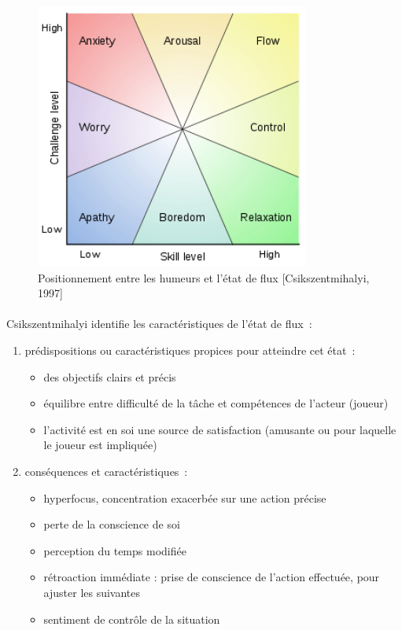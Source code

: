 \begin{figure}[h!]
	\centering
	\includegraphics[width=9cm]{images/state_of_flow.png}
	\caption{Positionnement entre les humeurs et l'état de flux [Csikszentmihalyi, 1997]\cite{Csik97}}
	\label{state_of_flow}
\end{figure}

\paragraph{}
Csikszentmihalyi identifie les caractéristiques de l’état de flux~:
\begin{enumerate}
   \item prédispositions ou caractéristiques propices pour atteindre cet état~:
         \begin{itemize}
            \item des objectifs clairs et précis
            \item équilibre entre difficulté de la tâche et compétences de l’acteur (joueur)
            \item l’activité est en soi une source de satisfaction (amusante ou pour laquelle le joueur est impliquée)
         \end{itemize}
   \item conséquences et caractéristiques~:
   	\begin{itemize}
            \item hyperfocus, concentration exacerbée sur une action précise
            \item perte de la conscience de soi
            \item perception du temps modifiée
            \item rétroaction immédiate : prise de conscience de l’action effectuée, pour ajuster les suivantes
            \item sentiment de contrôle de la situation
	\end{itemize}
\end{enumerate}